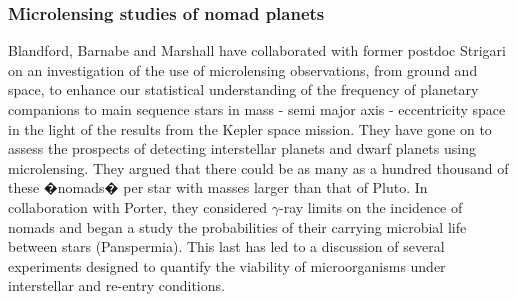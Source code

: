 \documentclass[psfig,11pt]{article}
\begin{document}
\subsubsection{Microlensing studies of nomad planets}
Blandford, Barnabe and Marshall have collaborated with former postdoc Strigari on an investigation of the use of microlensing observations, from ground and space, to enhance our statistical understanding of the frequency of planetary companions to main sequence stars in mass - semi major axis - eccentricity space in the light of the results from the Kepler space mission.  They have gone on  to assess the prospects of detecting interstellar planets and dwarf planets using microlensing. They argued that there could be as many as a hundred thousand of these �nomads� per star with masses larger than that of Pluto. In collaboration with Porter, they considered $\gamma$-ray limits on the incidence of nomads and began a study the probabilities of their carrying microbial life between stars (Panspermia). This last has led to a discussion of several experiments designed to quantify the viability of microorganisms under interstellar and re-entry conditions.


\clearpage
\pagestyle{empty}



\end{document}
